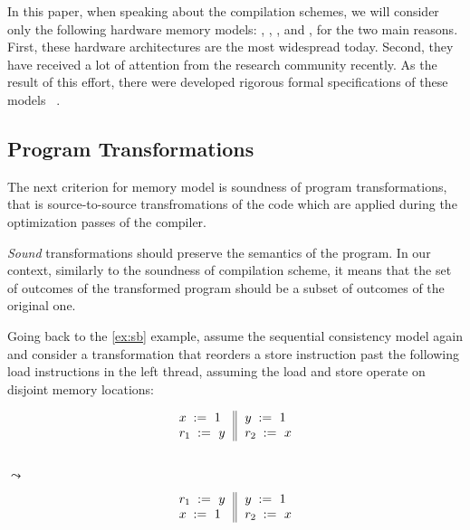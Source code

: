 In this paper, when speaking about the compilation schemes, 
we will consider only the following hardware memory models: 
\Intel, , , and \POWER, 
for the two main reasons. 
First, these hardware architectures are the 
most widespread today.
Second, they have received a lot of attention 
from the research community recently. 
As the result of this effort, 
there were developed rigorous formal 
specifications of these models~%
\cite{Sewell-al:CACM10, Sarkar-al:PLDI11, 
Flur-al:POPL16, Pulte-al:POPL18}. 

\subsection{Program Transformations}
\label{sec:background:trans}

The next criterion for memory model is 
soundness of program transformations, 
that is source-to-source transfromations of 
the code which are applied during 
the optimization passes of the compiler. 

\emph{Sound} transformations should preserve the semantics 
of the program. In our context, similarly to the 
soundness of compilation scheme, it means that 
the set of outcomes of the transformed program 
should be a subset of outcomes of the original one. 

Going back to the \ref{ex:sb} example, 
assume the sequential consistency model again and
consider a transformation that reorders 
a store instruction past the following load 
instructions in the left thread, 
assuming the load and store operate on disjoint memory locations:

\begin{minipage}{0.45\linewidth}
\begin{equation*}
\inarrII{
   \writeInst{}{x}{1}   \\
   \readInst{}{r_1}{y}  \\
}{
  \writeInst{}{y}{1}   \\
  \readInst{}{r_2}{x}  \\
}
\end{equation*}
\end{minipage}\hfill%
\begin{minipage}{0.05\linewidth}
\Large~\\ $\leadsto$
\end{minipage}\hfill%
\begin{minipage}{0.45\linewidth}
\begin{equation*}
\inarrII{
   \readInst{}{r_1}{y}  \\
   \writeInst{}{x}{1}   \\
}{
  \writeInst{}{y}{1}   \\
  \readInst{}{r_2}{x}  \\
}
\end{equation*}
\end{minipage}


